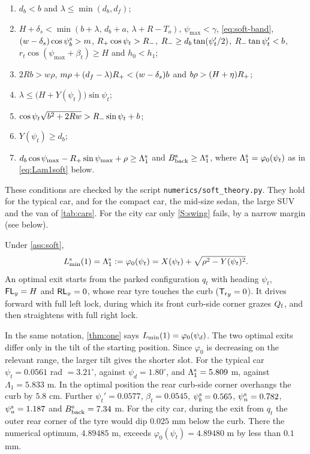 \begin{assumption}\label{ass:soft}
\leavevmode
\begin{enumerate}[label=(S\arabic*),nosep]
\item\label{S:db} $d_b<b$ and $\lambda\le\min(d_b,d_f)$;
\item\label{S:fit} $H+\delta_s<\min(b+\lambda,\,d_b+a,\,\lambda+R-T_o)$, $\psi_{\max}<\gamma$, \eqref{eq:soft-band}, $(w-\delta_s)\cos\psi_b^{\rm s}>m$, $R_{+}\cos\psi_t>R_{-}$, $R_{-}\ge d_b\tan(\psi_t'/2)$, $R_{-}\tan\psi_t'<b$, $r_t\cos(\psi_{\max}+\beta_t)\ge H$ and $h_0<h_1$;
\item\label{S:nose} $2Rb>w\rho$, $m\rho+(d_f-\lambda)R_{+}<(w-\delta_s)b$ and $b\rho>(H+\eta)R_{+}$;
\item\label{S:swing} $\lambda\le\big(H+Y(\psi_t)\big)\sin\psi_t$;
\item\label{S:min} $\cos\psi_t\sqrt{b^2+2Rw}>R_{-}\sin\psi_t+b$;
\item\label{S:end} $Y(\psi_t)\ge d_b$;
\item\label{S:far} $d_b\cos\psi_{\max}-R_{+}\sin\psi_{\max}+\rho\ge\Lambda_1^{\rm s}$ and $B^{\rm s}_{\rm back}\ge\Lambda_1^{\rm s}$, where $\Lambda_1^{\rm s}=\varphi_0(\psi_t)$ as in \eqref{eq:Lam1soft} below.
\end{enumerate}
\end{assumption}

These conditions are checked by the script \texttt{numerics/soft\_theory.py}.
They hold for the typical car, and for the compact car, the mid-size sedan, the large SUV and the van of \cref{tab:cars}.
For the city car only \ref{S:swing} fails, by a narrow margin (see below).

\begin{theorem}\label{thm:one-soft}
Under \cref{ass:soft},
\begin{equation}\label{eq:Lam1soft}
  L^{\mathrm s}_{\min}(1)=\Lambda_1^{\rm s}:=\varphi_0(\psi_t)=X(\psi_t)+\sqrt{\rho^2-Y(\psi_t)^2}.
\end{equation}
An optimal exit starts from the parked configuration $q_t$ with heading $\psi_t$, $\mathsf{FL}_y=H$ and $\mathsf{RL}_x=0$, whose rear tyre touches the curb ($\mathsf{T_r}_y=0$).
It drives forward with full left lock, during which its front curb-side corner grazes $Q_{\mathrm f}$, and then straightens with full right lock.
\end{theorem}

In the same notation, \cref{thm:one} says $L_{\min}(1)=\varphi_0(\psi_d)$.
The two optimal exits differ only in the tilt of the starting position.
Since $\varphi_0$ is decreasing on the relevant range, the larger tilt gives the shorter slot.
For the typical car $\psi_t=0.0561$ rad $=3.21^\circ$, against $\psi_d=1.80^\circ$, and $\Lambda_1^{\rm s}=5.809$ m, against $\Lambda_1=5.833$ m.
In the optimal position the rear curb-side corner overhangs the curb by $5.8$ cm.
Further $\psi_t'=0.0577$, $\beta_t=0.0545$, $\psi_b^{\rm s}=0.565$, $\psi_n^{\rm s}=0.782$, $\psi_u^{\rm s}=1.187$ and $B^{\rm s}_{\rm back}=7.34$ m.
For the city car, during the exit from $q_t$ the outer rear corner of the tyre would dip $0.025$ mm below the curb.
There the numerical optimum, $4.89485$ m, exceeds $\varphi_0(\psi_t)=4.89480$ m by less than $0.1$ mm.

